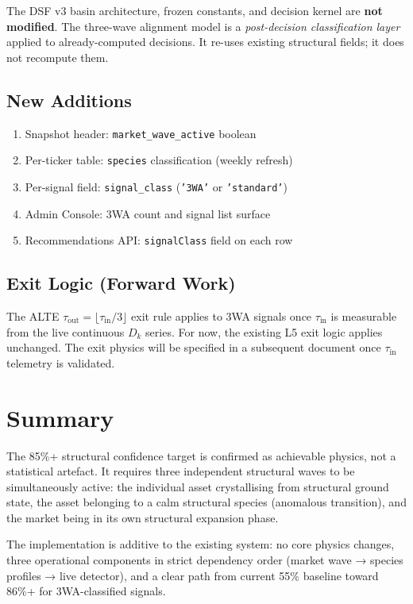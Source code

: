 \documentclass[11pt, a4paper]{article}
\newcommand{\Dk}{D_k}
\newcommand{\tauin}{\tau_{\mathrm{in}}}
\newcommand{\tauout}{\tau_{\mathrm{out}}}
\theoremstyle{definition}
\begin{document}
The DSF v3 basin architecture, frozen constants, and decision kernel are
\textbf{not modified}.
The three-wave alignment model is a \emph{post-decision classification layer}
applied to already-computed decisions.
It re-uses existing structural fields; it does not recompute them.

\subsection{New Additions}

\begin{enumerate}
  \item Snapshot header: \texttt{market\_wave\_active} boolean
  \item Per-ticker table: \texttt{species} classification (weekly refresh)
  \item Per-signal field: \texttt{signal\_class} (\texttt{'3WA'} or \texttt{'standard'})
  \item Admin Console: 3WA count and signal list surface
  \item Recommendations API: \texttt{signalClass} field on each row
\end{enumerate}

\subsection{Exit Logic (Forward Work)}

The ALTE $\tauout = \lfloor \tauin / 3 \rfloor$ exit rule applies to 3WA signals
once $\tauin$ is measurable from the live continuous $\Dk$ series.
For now, the existing L5 exit logic applies unchanged.
The exit physics will be specified in a subsequent document once
$\tauin$ telemetry is validated.

\section{Summary}

The 85\%+ structural confidence target is confirmed as achievable physics,
not a statistical artefact.
It requires three independent structural waves to be simultaneously active:
the individual asset crystallising from structural ground state,
the asset belonging to a calm structural species (anomalous transition),
and the market being in its own structural expansion phase.

The implementation is additive to the existing system: no core physics changes,
three operational components in strict dependency order (market wave → species
profiles → live detector), and a clear path from current 55\% baseline
toward 86\%+ for 3WA-classified signals.
\end{document}
